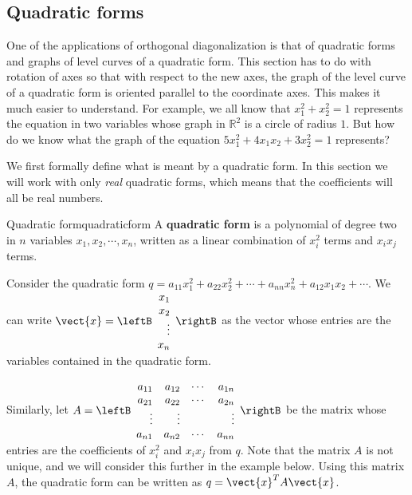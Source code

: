 \subsection{Quadratic forms}

One of the applications of orthogonal diagonalization is that of quadratic forms and graphs of level curves of a quadratic form. This section has to do with rotation of axes
so that with respect to the new axes, the graph of the level curve of a
quadratic form is oriented parallel to the coordinate axes. This makes it
much easier to understand. For example, we all know that $x_1^2 + x_2^2=1$ represents the equation in two variables whose graph in $\mathbb{R}^2$ is a circle of radius $1$. But how do we know what the graph of the equation $5x_1^2 + 4x_1x_2 + 3x_2^2=1$ represents?  

We first formally define what is meant by a quadratic form. In this section we will work with only \textit{real} quadratic forms, which means that the coefficients will all be real numbers. 

\begin{definition}{Quadratic form}{quadraticform}
A \textbf{quadratic form} is a polynomial of degree two in $n$ variables $x_1, x_2, \cdots, x_n$, written as a linear combination of $x_i^{2}$ terms and $x_ix_j$ terms. 
\end{definition}

Consider the quadratic form $q = a_{11}x_1^2 + a_{22}x_2^2 + \cdots + a_{nn}x_n^2 + a_{12}x_1x_2 + \cdots$. We can write $\vect{x} = \leftB 
\begin{array}{r}
x_1 \\
x_2 \\
\vdots \\
x_n
\end{array} \rightB$ as the vector whose entries are the variables contained in the quadratic form.

Similarly, let $A = \leftB
\begin{array}{rrrr}
a_{11} & a_{12} & \cdots & a_{1n} \\
a_{21} & a_{22} & \cdots & a_{2n} \\
\vdots & \vdots & & \vdots \\
a_{n1} & a_{n2} & \cdots & a_{nn}
\end{array}
\rightB$ be the matrix whose entries are the coefficients of $x_i^2$ and $x_ix_j$ from $q$. Note that the matrix $A$ is not unique, and we will consider this further in the example below. Using this matrix $A$,  the quadratic form can be written as $q = \vect{x}^T A \vect{x}$. 

